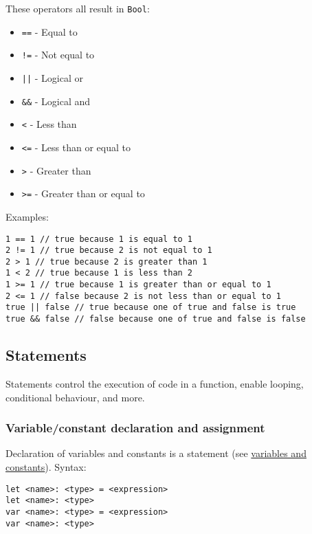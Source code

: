 These operators all result in \texttt{Bool}:

\begin{itemize}
	\item \texttt{==} - Equal to
	\item \texttt{!=} - Not equal to
	\item \texttt{||} - Logical or
	\item \texttt{&&} - Logical and
	\item \texttt{<} - Less than
	\item \texttt{<=} - Less than or equal to
	\item \texttt{>} - Greater than
	\item \texttt{>=} - Greater than or equal to
\end{itemize}

Examples:

\begin{verbatim}
1 == 1 // true because 1 is equal to 1
2 != 1 // true because 2 is not equal to 1
2 > 1 // true because 2 is greater than 1
1 < 2 // true because 1 is less than 2
1 >= 1 // true because 1 is greater than or equal to 1
2 <= 1 // false because 2 is not less than or equal to 1
true || false // true because one of true and false is true
true && false // false because one of true and false is false
\end{verbatim}

\subsection{Statements}
\label{sec:appendix-b-statements}

Statements control the execution of code in a function, enable looping, conditional behaviour, and more.

\subsubsection{Variable/constant declaration and assignment}
\label{sec:appendix-b-variableconstant-declaration-and-assignment}

Declaration of variables and constants is a statement (see \hyperref[sec:appendix-b-constants-and-variables]{variables and constants}). Syntax:

\begin{verbatim}
let <name>: <type> = <expression>
let <name>: <type>
var <name>: <type> = <expression>
var <name>: <type>
\end{verbatim}

